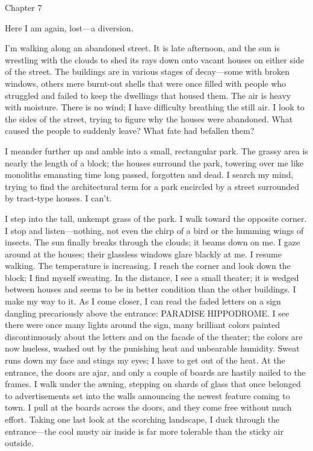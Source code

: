 Chapter 7

Here I am again, lost---a diversion.

I'm walking along an abandoned street. It is late afternoon, and the sun
is wrestling with the clouds to shed its rays down onto vacant houses on
either side of the street. The buildings are in various stages of
decay---some with broken windows, others mere burnt-out shells that were
once filled with people who struggled and failed to keep the dwellings
that housed them. The air is heavy with moisture. There is no wind; I
have difficulty breathing the still air. I look to the sides of the
street, trying to figure why the houses were abandoned. What caused the
people to suddenly leave? What fate had befallen them?

I meander further up and amble into a small, rectangular park. The
grassy area is nearly the length of a block; the houses surround the
park, towering over me like monoliths emanating time long passed,
forgotten and dead. I search my mind, trying to find the architectural
term for a park encircled by a street surrounded by tract-type houses. I
can't.

I step into the tall, unkempt grass of the park. I walk toward the
opposite corner. I stop and listen---nothing, not even the chirp of a
bird or the humming wings of insects. The sun finally breaks through the
clouds; it beams down on me. I gaze around at the houses; their
glassless windows glare blackly at me. I resume walking. The temperature
is increasing. I reach the corner and look down the block; I find myself
sweating. In the distance, I see a small theater; it is wedged between
houses and seems to be in better condition than the other buildings. I
make my way to it. As I come closer, I can read the faded letters on a
sign dangling precariously above the entrance: PARADISE HIPPODROME. I
see there were once many lights around the sign, many brilliant colors
painted discontinuously about the letters and on the facade of the
theater; the colors are now hueless, washed out by the punishing heat
and unbearable humidity. Sweat runs down my face and stings my eyes; I
have to get out of the heat. At the entrance, the doors are ajar, and
only a couple of boards are hastily nailed to the frames. I walk under
the awning, stepping on shards of glass that once belonged to
advertisements set into the walls announcing the newest feature coming
to town. I pull at the boards across the doors, and they come free
without much effort. Taking one last look at the scorching landscape, I
duck through the entrance---the cool musty air inside is far more
tolerable than the sticky air outside.

